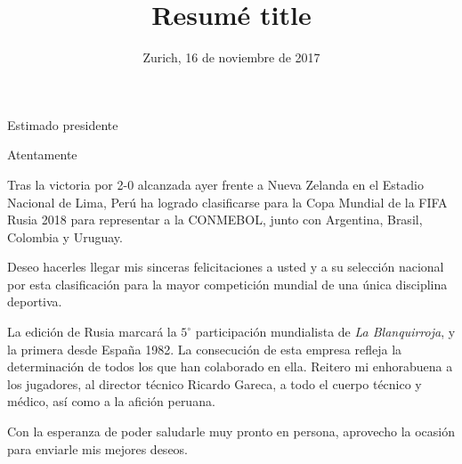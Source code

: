 \documentclass[12pt,a4paper,sans]{moderncv}
\title{Resumé title}
\begin{document}
	
	\date{Zurich, 16 de noviembre de 2017}
	\opening{Estimado presidente}
	
	\closing{Atentamente}
	\makelettertitle
	Tras la victoria por 2-0 alcanzada ayer frente a Nueva Zelanda en el Estadio Nacional de Lima, Perú ha logrado clasificarse para la Copa Mundial de la FIFA Rusia 2018 para representar a la CONMEBOL, junto con Argentina, Brasil, Colombia y Uruguay.
	
	Deseo hacerles llegar mis sinceras felicitaciones a usted y a su selección nacional por esta clasificación para la mayor competición mundial de una única disciplina deportiva.
	
	La edición de Rusia marcará la $5^{\circ}$ participación mundialista de \emph{La Blanquirroja}, y la primera desde España 1982. La consecución de esta empresa refleja la determinación de todos los que han colaborado en ella. Reitero mi enhorabuena a los jugadores, al director técnico Ricardo Gareca, a todo el cuerpo técnico y médico, así como a la afición peruana.
	
	Con la esperanza de poder saludarle muy pronto en persona, aprovecho la ocasión para enviarle mis mejores deseos.
	
	\makeletterclosing
	
\end{document}
